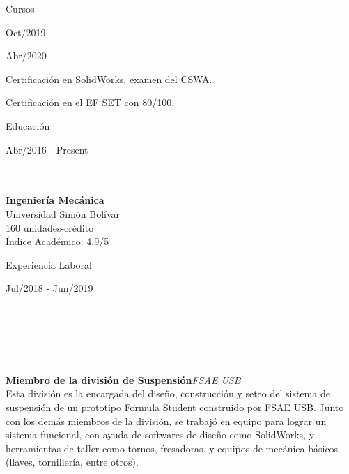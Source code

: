 \documentclass[10pt]{article}
\begin{document}
\begin{multicols}{2}
\begin{LARGE}
\color{blue!50!black}
Cursos\par
\end{LARGE}
\begin{multicols}{2}
\hspace{5pt}Oct/2019\\
\hfill\par
\hspace{5pt}Abr/2020\\
\par
Certificación en SolidWorks, examen del CSWA.\par
Certificación en el EF SET con 80/100.\\
\end{multicols}
\columnbreak
\begin{LARGE}
\color{blue!50!black}
Educación\par
\end{LARGE}
\begin{multicols}{2}
\hspace{5pt}Abr/2016 - Present\\
\hfill\\
\hfill\\
\hfill\par
\hfill\par
\textbf{Ingeniería Mecánica}\\
Universidad Simón Bolívar\\
160 unidades-crédito\\
Índice Académico: 4.9/5
\end{multicols}
\end{multicols}
\begin{LARGE}
\color{blue!50!black}
Experiencia Laboral\par
\end{LARGE}
\begin{vwcol}[widths={0.22,0.78},
 sep=.8cm,rule=0pt,indent=0em,lines=6] 
\hspace{5pt}Jul/2018 - Jun/2019\par
\hfill\\
\hfill\\
\hfill\\
\hfill\\
\hfill\\
\textbf{Miembro de la división de Suspensión}\hfill \textit{FSAE USB}\\
Esta división es la encargada del diseño, construcción y seteo del sistema de suspensión de un prototipo Formula Student construido por FSAE USB. Junto con los demás miembros de la división, se trabajó en equipo para lograr un sistema funcional, con ayuda de softwares de diseño como SolidWorks, y herramientas de taller como tornos, fresadoras, y equipos de mecánica básicos (llaves, tornillería, entre otros).\par
\end{vwcol}
\end{document}
